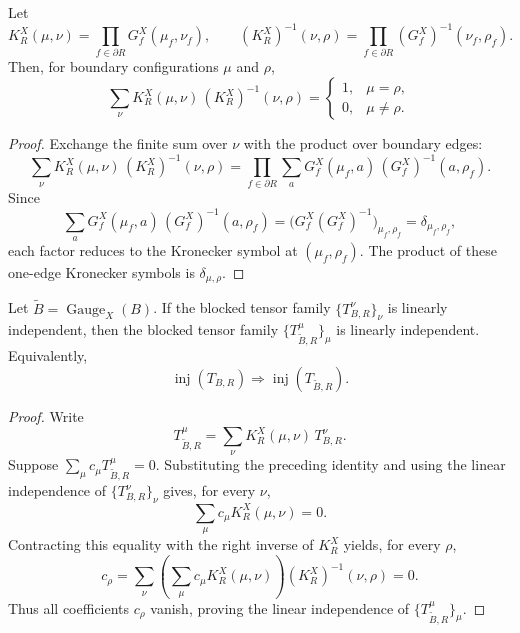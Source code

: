 \begin{theorem}
    \label{thm:peps_sum_regionBoundaryCoupling_mul_inv}
    \leanok
    Let
    \[
        K_R^X(\mu,\nu)=\prod_{f\in\partial R}G_f^X(\mu_f,\nu_f),
        \qquad
        (K_R^X)^{-1}(\nu,\rho)
        =
        \prod_{f\in\partial R}(G_f^X)^{-1}(\nu_f,\rho_f).
    \]
    Then, for boundary configurations $\mu$ and $\rho$,
    \[
        \sum_{\nu}K_R^X(\mu,\nu)\,(K_R^X)^{-1}(\nu,\rho)
        =
        \begin{cases}
            1, & \mu=\rho,    \\
            0, & \mu\neq\rho.
        \end{cases}
    \]
\end{theorem}
\begin{proof}\leanok
    Exchange the finite sum over $\nu$ with the product over boundary edges:
    \[
        \sum_{\nu}K_R^X(\mu,\nu)\,(K_R^X)^{-1}(\nu,\rho)
        =
        \prod_{f\in\partial R}
        \sum_a G_f^X(\mu_f,a)\,(G_f^X)^{-1}(a,\rho_f).
    \]
    Since
    \[
        \sum_a G_f^X(\mu_f,a)\,(G_f^X)^{-1}(a,\rho_f)
        =
        \bigl(G_f^X(G_f^X)^{-1}\bigr)_{\mu_f,\rho_f}
        =
        \delta_{\mu_f,\rho_f},
    \]
    each factor reduces to the Kronecker symbol at $(\mu_f,\rho_f)$.  The
    product of these one-edge Kronecker symbols is $\delta_{\mu,\rho}$.
\end{proof}

\begin{theorem}
    \label{thm:peps_regionBlockedTensorInjective_applyGauge}
    \leanok
    Let $\widetilde B=\operatorname{Gauge}_X(B)$.  If the blocked tensor family
    $\{T_{B,R}^{\nu}\}_{\nu}$ is linearly independent, then the blocked tensor
    family $\{T_{\widetilde B,R}^{\mu}\}_{\mu}$ is linearly independent.
    Equivalently,
    \[
        \operatorname{inj}(T_{B,R})
        \Longrightarrow
        \operatorname{inj}(T_{\widetilde B,R}).
    \]
\end{theorem}
\begin{proof}\leanok
    Write
    \[
        T_{\widetilde B,R}^{\mu}
        =
        \sum_{\nu}K_R^X(\mu,\nu)\,T_{B,R}^{\nu}.
    \]
    Suppose $\sum_\mu c_\mu T_{\widetilde B,R}^{\mu}=0$.  Substituting the
    preceding identity and using the linear independence of
    $\{T_{B,R}^{\nu}\}_{\nu}$ gives, for every $\nu$,
    \[
        \sum_{\mu}c_\mu K_R^X(\mu,\nu)=0.
    \]
    Contracting this equality with the right inverse of $K_R^X$ yields, for
    every $\rho$,
    \[
        c_\rho
        =
        \sum_{\nu}
        \left(\sum_{\mu}c_\mu K_R^X(\mu,\nu)\right)
        (K_R^X)^{-1}(\nu,\rho)
        =
        0.
    \]
    Thus all coefficients $c_\rho$ vanish, proving the linear independence of
    $\{T_{\widetilde B,R}^{\mu}\}_{\mu}$.
\end{proof}

